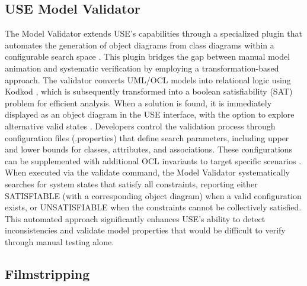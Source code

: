 \subsection{USE Model Validator}
\hspace{1cm} The Model Validator extends USE's capabilities through a specialized plugin that 
automates the generation of object diagrams from class diagrams within a configurable 
search space \cite{USE}. This plugin bridges the gap between manual model animation 
and systematic verification by employing a transformation-based approach. The 
validator converts UML/OCL models into relational logic using Kodkod \cite{Kodkod}, which is 
subsequently transformed into a boolean satisfiability (SAT) problem for efficient 
analysis. When a solution is found, it is immediately displayed as an object diagram 
in the USE interface, with the option to explore alternative valid states \cite{Model_Validator_2}. Developers 
control the validation process through configuration files (.properties) that define 
search parameters, including upper and lower bounds for classes, attributes, and 
associations. These configurations can be supplemented with additional OCL invariants 
to target specific scenarios \cite{Properties_file}. When executed via the validate command, the Model 
Validator systematically searches for system states that satisfy all constraints, 
reporting either SATISFIABLE (with a corresponding object diagram) when a valid 
configuration exists, or UNSATISFIABLE when the constraints cannot be collectively 
satisfied. This automated approach significantly enhances USE's ability to detect 
inconsistencies and validate model properties that would be difficult to verify 
through manual testing alone.


\subsection{Filmstripping}
\label{subsec:filmstripping}
